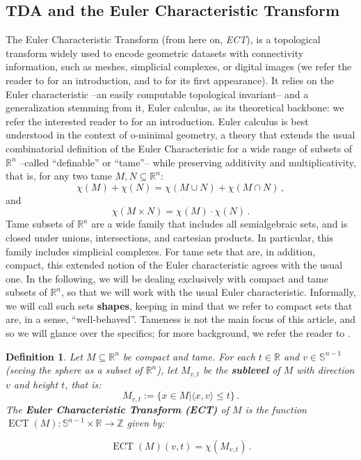 \documentclass[a4paper]{article}
\newtheorem{definition}[theorem]{Definition}
\newcommand{\ECT}{\operatorname{ECT}}
\newcommand{\bb}{\mathbb}
\begin{document}
\subsection{TDA and the Euler Characteristic Transform}
\label{ECT}
The Euler Characteristic Transform (from here on, \emph{ECT}), is a topological transform widely used to encode geometric datasets with connectivity information, such as meshes, simplicial complexes, or digital images (we refer the reader to \cite{munch2025invitation} for an introduction, and to \cite{turner2014persistent} for its first appearance). It relies on the Euler characteristic --an easily computable topological invariant-- and a generalization stemming from it, Euler calculus, as its theoretical backbone: we refer the interested reader to \cite{curry2012euler} for an introduction. Euler calculus is best understood in the context of o-minimal geometry, a theory that extends the usual combinatorial definition of the Euler Characteristic for a wide range of subsets of $\mathbb R^n$ --called ``definable'' or ``tame''-- while preserving additivity and multiplicativity, that is, for any two tame $M, N \subseteq \mathbb R^{n}$:
\begin{equation} \label{AddEuler}
	\chi(M)+\chi(N)=\chi(M \cup N)+\chi(M \cap N)\, ,
 \end{equation}
and 
\begin{equation}
	\chi(M \times N)=\chi(M)\cdot\chi(N) \, .
\end{equation}
Tame subsets of $\mathbb R^n$ are a wide family that includes all semialgebraic sets, and is closed under unions, intersections, and cartesian products. In particular, this family includes simplicial complexes. For tame sets that are, in addition, compact, this extended notion of the Euler characteristic agrees with the usual one. In the following, we will be dealing exclusively with compact and tame subsets of $\bb R^n$, so that we will work with the usual Euler characteristic. Informally, we will call such sets \textbf{shapes}, keeping in mind that we refer to compact sets that are, in a sense, ``well-behaved''. Tameness is not the main focus of this article, and so we will glance over the specifics; for more background, we refer the reader to \cite{coste1999introduction}.


\begin{definition}
	Let $M\subseteq \mathbb R^n$ be compact and tame. For each $t\in \mathbb R$ and $v \in \mathbb S^{n-1}$ (seeing the sphere as a subset of $\mathbb R^n$), let $M_{v,t}$ be the \textbf{sublevel} of $M$ with direction $v$ and height $t$, that is:
	\[ M_{v,t}:=\{ x \in M | \langle x, v\rangle \leq t \}\, . \]
	The \textbf{Euler Characteristic Transform (ECT)} of $M$ is the function $\ECT(M): \mathbb S^{n-1} \times \mathbb R \to \mathbb Z$ given by:
	
	\[ \ECT(M)(v,t)=\chi(M_{v,t})\, .\]
\end{definition}
\end{document}
